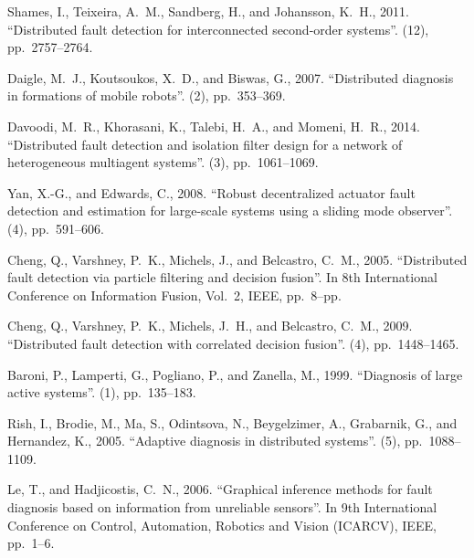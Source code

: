 \documentclass[10pt,twocolumn,twoside]{IEEEtran}
\begin{document}
\begin{thebibliography}{10}
Shames, I., Teixeira, A.~M., Sandberg, H., and Johansson, K.~H., 2011.
\newblock ``Distributed fault detection for interconnected second-order
  systems''.
(12), pp.~2757--2764.

Daigle, M.~J., Koutsoukos, X.~D., and Biswas, G., 2007.
\newblock ``Distributed diagnosis in formations of mobile robots''.
(2), pp.~353--369.

Davoodi, M.~R., Khorasani, K., Talebi, H.~A., and Momeni, H.~R., 2014.
\newblock ``Distributed fault detection and isolation filter design for a
  network of heterogeneous multiagent systems''.
(3), pp.~1061--1069.

Yan, X.-G., and Edwards, C., 2008.
\newblock ``Robust decentralized actuator fault detection and estimation for
  large-scale systems using a sliding mode observer''.
(4),
  pp.~591--606.

Cheng, Q., Varshney, P.~K., Michels, J., and Belcastro, C.~M., 2005.
\newblock ``Distributed fault detection via particle filtering and decision
  fusion''.
\newblock In 8th International Conference on Information Fusion, Vol.~2, IEEE,
  pp.~8--pp.

Cheng, Q., Varshney, P.~K., Michels, J.~H., and Belcastro, C.~M., 2009.
\newblock ``Distributed fault detection with correlated decision fusion''.
(4), pp.~1448--1465.

Baroni, P., Lamperti, G., Pogliano, P., and Zanella, M., 1999.
\newblock ``Diagnosis of large active systems''.
(1), pp.~135--183.

Rish, I., Brodie, M., Ma, S., Odintsova, N., Beygelzimer, A., Grabarnik, G.,
  and Hernandez, K., 2005.
\newblock ``Adaptive diagnosis in distributed systems''.
(5),
  pp.~1088--1109.

Le, T., and Hadjicostis, C.~N., 2006.
\newblock ``Graphical inference methods for fault diagnosis based on
  information from unreliable sensors''.
\newblock In 9th International Conference on Control, Automation, Robotics and
  Vision (ICARCV), IEEE, pp.~1--6.


\end{thebibliography}
\end{document}
